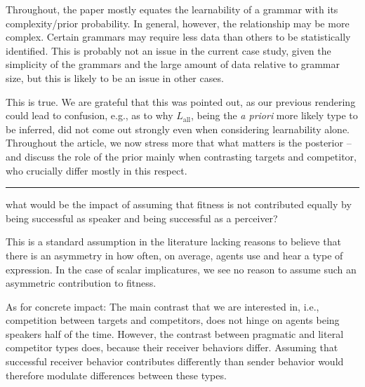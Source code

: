 \documentclass[12pt,a4paper]{article}
\newcommand{\hl}[1]{\textcolor[rgb]{.8,.33,.0}{#1}}%
\begin{document}
\begin{mdframed}[backgroundcolor=gray!25,linecolor=gray!25,frametitle= Reviewer \thereviewerCounter~comment \thereviewerCommentCounter \hfill ~~({\it Learnability})]
%
Throughout, the paper mostly equates the learnability of a grammar with its complexity/prior probability. In general, however, the relationship may be more complex. Certain grammars may require less data than others to be statistically identified. This is probably not an issue in the current case study, given the simplicity of the grammars and the large amount of data relative to grammar size, but this is likely to be an issue in other cases.

%
\end{mdframed}

This is true. We are grateful that this was pointed out, as our previous rendering could lead to confusion, e.g., as to why $L_{\text{all}}$, being the {\em a priori} more likely type to be inferred, did not come out strongly even when considering learnability alone. \hl{Throughout the article, we now stress more that what matters is the posterior -- and discuss the role of the prior mainly when contrasting targets and competitor, who crucially differ mostly in this respect.}

%


\noindent\rule{\textwidth}{1pt}

\begin{mdframed}[backgroundcolor=gray!25,linecolor=gray!25,frametitle= Reviewer \thereviewerCounter~comment \thereviewerCommentCounter \hfill ~~({\it expected utility})]
%
what would be the impact of assuming that fitness is not contributed equally by being successful as speaker and being successful as a perceiver?

%
\end{mdframed}

This is a standard assumption in the literature lacking reasons to believe that there is an asymmetry in how often, on average, agents use and hear a type of expression. In the case of scalar implicatures, we see no reason to assume such an asymmetric contribution to fitness. 

As for concrete impact: The main contrast that we are interested in, i.e., competition between targets and competitors, does not hinge on agents being speakers half of the time. However, the contrast between pragmatic and literal competitor types does, because their receiver behaviors differ. Assuming that successful receiver behavior contributes differently than sender behavior would therefore modulate differences between these types.
\end{document}
